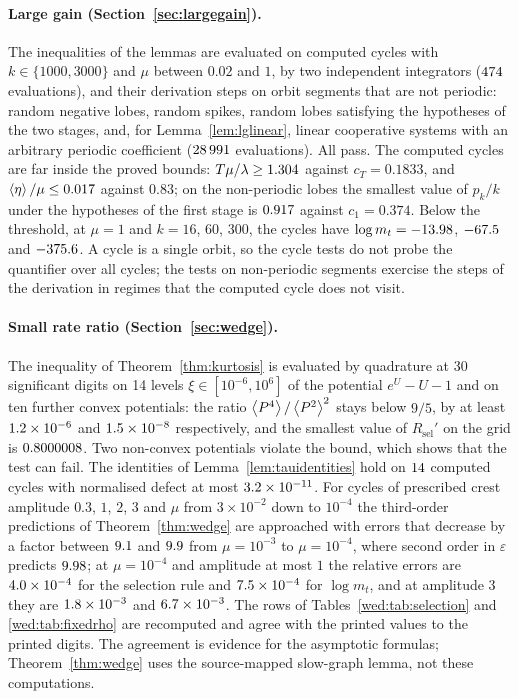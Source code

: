 \paragraph{Large gain (Section~\ref{sec:largegain}).}
The inequalities of the lemmas are evaluated on computed cycles with $k\in\{1000,3000\}$ and $\mu$ between $0.02$ and $1$, by two independent integrators ($474$ evaluations), and their derivation steps on orbit segments that are not periodic: random negative lobes, random spikes, random lobes satisfying the hypotheses of the two stages, and, for Lemma~\ref{lem:lglinear}, linear cooperative systems with an arbitrary periodic coefficient ($28\,991$ evaluations). All pass. The computed cycles are far inside the proved bounds: $T\mu/\lambda\ge1.304$ against $c_T=0.1833$, and $\left\langle \eta\right\rangle/\mu\le0.017$ against $0.83$; on the non-periodic lobes the smallest value of $p_k/k$ under the hypotheses of the first stage is $0.917$ against $c_1=0.374$. Below the threshold, at $\mu=1$ and $k=16$, $60$, $300$, the cycles have $\log m_t=-13.98$, $-67.5$ and $-375.6$. A cycle is a single orbit, so the cycle tests do not probe the quantifier over all cycles; the tests on non-periodic segments exercise the steps of the derivation in regimes that the computed cycle does not visit.

\paragraph{Small rate ratio (Section~\ref{sec:wedge}).}
The inequality of Theorem~\ref{thm:kurtosis} is evaluated by quadrature at 30 significant digits on 14 levels $\xi\in[10^{-6},10^{6}]$ of the potential $e^U-U-1$ and on ten further convex potentials: the ratio $\left\langle P^4\right\rangle/\left\langle P^2\right\rangle^2$ stays below $9/5$, by at least $1.2\times10^{-6}$ and $1.5\times10^{-8}$ respectively, and the smallest value of $R_{\mathrm{sel}}'$ on the grid is $0.8000008$. Two non-convex potentials violate the bound, which shows that the test can fail. The identities of Lemma~\ref{lem:tauidentities} hold on $14$ computed cycles with normalised defect at most $3.2\times10^{-11}$. For cycles of prescribed crest amplitude $0.3$, $1$, $2$, $3$ and $\mu$ from $3\times10^{-2}$ down to $10^{-4}$ the third-order predictions of Theorem~\ref{thm:wedge} are approached with errors that decrease by a factor between $9.1$ and $9.9$ from $\mu=10^{-3}$ to $\mu=10^{-4}$, where second order in $\varepsilon$ predicts $9.98$; at $\mu=10^{-4}$ and amplitude at most $1$ the relative errors are $4.0\times10^{-4}$ for the selection rule and $7.5\times10^{-4}$ for $\log m_t$, and at amplitude $3$ they are $1.8\times10^{-3}$ and $6.7\times10^{-3}$. The rows of Tables~\ref{wed:tab:selection} and \ref{wed:tab:fixedrho} are recomputed and agree with the printed values to the printed digits. The agreement is evidence for the asymptotic formulas; Theorem~\ref{thm:wedge} uses the source-mapped slow-graph lemma, not these computations.

